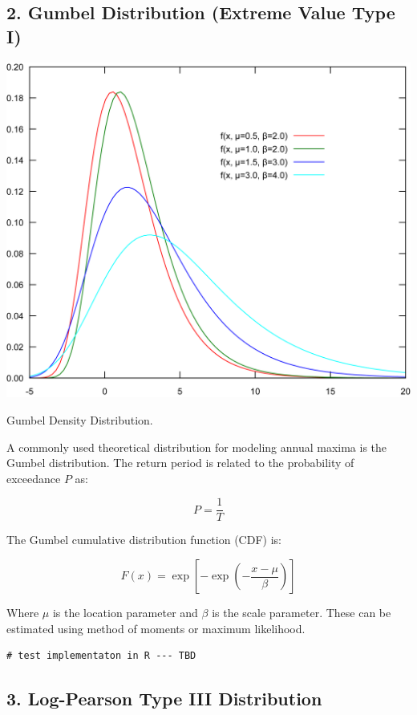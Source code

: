 \documentclass{tufte-handout}\usepackage[]{graphicx}\usepackage[]{xcolor}
\begin{document}
\subsection{2. Gumbel Distribution (Extreme Value Type I)}

\begin{marginfigure}
	\centering
		\includegraphics[width=1.00\textwidth]{figure/Gumbel-Density.png}
		\caption{Gumbel Density Distribution.}
	\label{fig:Gumbel}
\end{marginfigure}

A commonly used theoretical distribution for modeling annual maxima is the Gumbel distribution. The return period is related to the probability of exceedance \( P \) as:

\[
P = \frac{1}{T}
\]

The Gumbel cumulative distribution function (CDF) is:

\[
F(x) = \exp\left[-\exp\left(-\frac{x - \mu}{\beta}\right)\right]
\]

Where \( \mu \) is the location parameter and \( \beta \) is the scale parameter. These can be estimated using method of moments or maximum likelihood.


\begin{verbatim}
# test implementaton in R --- TBD
\end{verbatim}

\subsection{3. Log-Pearson Type III Distribution}
\end{document}
